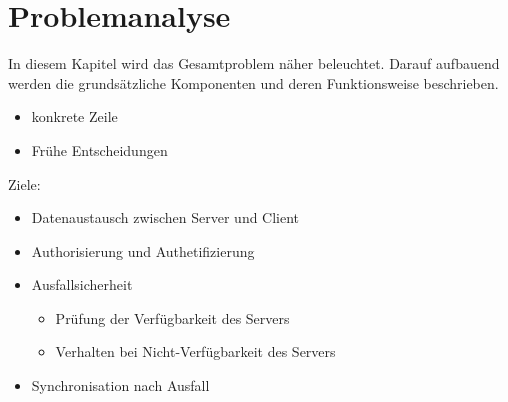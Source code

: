 \chapter{Problemanalyse}
\label{cha:problemanalyse}
In diesem Kapitel wird das Gesamtproblem näher beleuchtet. Darauf aufbauend werden die grundsätzliche Komponenten und deren Funktionsweise beschrieben. 


\begin{itemize}
\item konkrete Zeile
\item Frühe Entscheidungen
\end{itemize}

Ziele:
\begin{itemize}
\item Datenaustausch zwischen Server und Client
\item Authorisierung und Authetifizierung
\item Ausfallsicherheit
\begin{itemize}
\item Prüfung der Verfügbarkeit des Servers
\item Verhalten bei Nicht-Verfügbarkeit des Servers
\end{itemize}
\item Synchronisation nach Ausfall
\end{itemize}